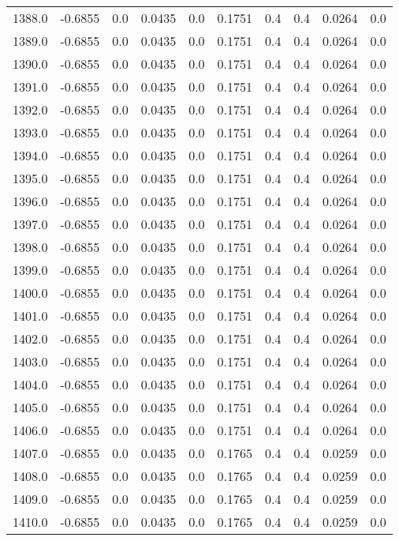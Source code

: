 \begin{longtable}{lrrrrrrrrr}
1388.0 & -0.6855 & 0.0 & 0.0435 & 0.0 & 0.1751 & 0.4 & 0.4 & 0.0264 & 0.0 \\
1389.0 & -0.6855 & 0.0 & 0.0435 & 0.0 & 0.1751 & 0.4 & 0.4 & 0.0264 & 0.0 \\
1390.0 & -0.6855 & 0.0 & 0.0435 & 0.0 & 0.1751 & 0.4 & 0.4 & 0.0264 & 0.0 \\
1391.0 & -0.6855 & 0.0 & 0.0435 & 0.0 & 0.1751 & 0.4 & 0.4 & 0.0264 & 0.0 \\
1392.0 & -0.6855 & 0.0 & 0.0435 & 0.0 & 0.1751 & 0.4 & 0.4 & 0.0264 & 0.0 \\
1393.0 & -0.6855 & 0.0 & 0.0435 & 0.0 & 0.1751 & 0.4 & 0.4 & 0.0264 & 0.0 \\
1394.0 & -0.6855 & 0.0 & 0.0435 & 0.0 & 0.1751 & 0.4 & 0.4 & 0.0264 & 0.0 \\
1395.0 & -0.6855 & 0.0 & 0.0435 & 0.0 & 0.1751 & 0.4 & 0.4 & 0.0264 & 0.0 \\
1396.0 & -0.6855 & 0.0 & 0.0435 & 0.0 & 0.1751 & 0.4 & 0.4 & 0.0264 & 0.0 \\
1397.0 & -0.6855 & 0.0 & 0.0435 & 0.0 & 0.1751 & 0.4 & 0.4 & 0.0264 & 0.0 \\
1398.0 & -0.6855 & 0.0 & 0.0435 & 0.0 & 0.1751 & 0.4 & 0.4 & 0.0264 & 0.0 \\
1399.0 & -0.6855 & 0.0 & 0.0435 & 0.0 & 0.1751 & 0.4 & 0.4 & 0.0264 & 0.0 \\
1400.0 & -0.6855 & 0.0 & 0.0435 & 0.0 & 0.1751 & 0.4 & 0.4 & 0.0264 & 0.0 \\
1401.0 & -0.6855 & 0.0 & 0.0435 & 0.0 & 0.1751 & 0.4 & 0.4 & 0.0264 & 0.0 \\
1402.0 & -0.6855 & 0.0 & 0.0435 & 0.0 & 0.1751 & 0.4 & 0.4 & 0.0264 & 0.0 \\
1403.0 & -0.6855 & 0.0 & 0.0435 & 0.0 & 0.1751 & 0.4 & 0.4 & 0.0264 & 0.0 \\
1404.0 & -0.6855 & 0.0 & 0.0435 & 0.0 & 0.1751 & 0.4 & 0.4 & 0.0264 & 0.0 \\
1405.0 & -0.6855 & 0.0 & 0.0435 & 0.0 & 0.1751 & 0.4 & 0.4 & 0.0264 & 0.0 \\
1406.0 & -0.6855 & 0.0 & 0.0435 & 0.0 & 0.1751 & 0.4 & 0.4 & 0.0264 & 0.0 \\
1407.0 & -0.6855 & 0.0 & 0.0435 & 0.0 & 0.1765 & 0.4 & 0.4 & 0.0259 & 0.0 \\
1408.0 & -0.6855 & 0.0 & 0.0435 & 0.0 & 0.1765 & 0.4 & 0.4 & 0.0259 & 0.0 \\
1409.0 & -0.6855 & 0.0 & 0.0435 & 0.0 & 0.1765 & 0.4 & 0.4 & 0.0259 & 0.0 \\
1410.0 & -0.6855 & 0.0 & 0.0435 & 0.0 & 0.1765 & 0.4 & 0.4 & 0.0259 & 0.0 \\

\end{longtable}
